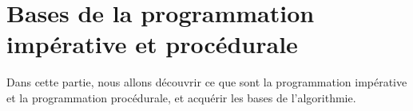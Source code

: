 \part{Bases de la programmation impérative et procédurale}

Dans cette partie, nous allons découvrir ce que sont
la programmation impérative et la programmation procédurale,
et acquérir les bases de l’algorithmie.











